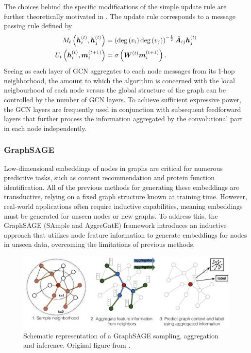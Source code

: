 The choices behind the specific modifications of the simple update rule are further theoretically motivated in \cite{kipf_semi-supervised_2017}. The update rule corresponds to a message passing rule defined by
\begin{equation}
	\begin{split}
		M_t \left( \bm{h}_i^{(t)}, \bm{h}_j^{(t)} \right) &= \left( \mathrm{deg} \left( v_i \right) \mathrm{deg} \left( v_j \right) \right)^{-\frac{1}{2}} \tilde{\bm{A}}_{ij} \bm{h}_j^{(t)} \\
		U_t \left( \bm{h}_i^{(t)}, \bm{m}_i^{(t+1)} \right) &= \sigma \left( \bm{W}^{(t)} \bm{m}_i^{(t+1)} \right). \\
	\end{split}
\end{equation}
Seeing as each layer of GCN aggregates to each node messages from its 1-hop neighborhood, the amount to which the algorithm is concerned with the local neigbourhood of each node versus the global structure of the graph can be controlled by the number of GCN layers. To achieve sufficient expressive power, the GCN layers are frequently used in conjunction with subsequent feedforward layers that further process the information aggregated by the convolutional part in each node independently.

\subsubsection{GraphSAGE}

Low-dimensional embeddings of nodes in graphs are critical for numerous predictive tasks, such as content recommendation and protein function identification. All of the previous methods for generating these embeddings are transductive, relying on a fixed graph structure known at training time. However, real-world applications often require inductive capabilities, meaning embeddings must be generated for unseen nodes or new graphs. To address this, the GraphSAGE (SAmple and AggreGatE) framework introduces an inductive approach that utilizes node feature information to generate embeddings for nodes in unseen data, overcoming the limitations of previous methods.

\begin{figure}
	\includegraphics[width=\linewidth]{images/GraphSAGE.png}
	\caption{Schematic representation of a GraphSAGE sampling, aggregation and inference. Original figure from \cite{hamilton_inductive_2017}.}
	\label{fig:GraphSAGE}
\end{figure}

